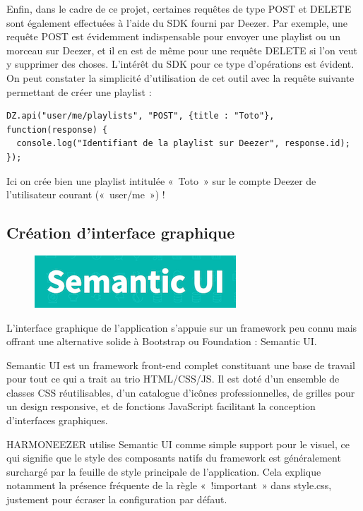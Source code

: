 \documentclass[a4paper,12pt]{article}
\begin{document}
Enfin, dans le cadre de ce projet, certaines requêtes de type POST et DELETE sont également effectuées à l'aide du SDK fourni par Deezer. Par exemple, une requête POST est évidemment indispensable pour envoyer une playlist ou un morceau sur Deezer, et il en est de même pour une requête DELETE si l'on veut y supprimer des choses. L'intérêt du SDK pour ce type d'opérations est évident. On peut constater la simplicité d'utilisation de cet outil avec la requête suivante permettant de créer une playlist :

\vspace{7pt}

\begin{lstlisting}
DZ.api("user/me/playlists", "POST", {title : "Toto"}, function(response) {
  console.log("Identifiant de la playlist sur Deezer", response.id);
});
\end{lstlisting}

Ici on crée bien une playlist intitulée «~Toto~» sur le compte Deezer de l'utilisateur courant («~user/me~») !

\newpage

\subsection{Création d'interface graphique}

\begin{figure}[!h]
  \begin{center}
    \includegraphics[scale=0.5]{logo-semanticui.png}
  \end{center}
\end{figure}

L'interface graphique de l'application s'appuie sur un framework peu connu mais offrant une alternative solide à Bootstrap ou Foundation : Semantic UI.

Semantic UI est un framework front-end complet constituant une base de travail pour tout ce qui a trait au trio HTML/CSS/JS. Il est doté d'un ensemble de classes CSS réutilisables, d'un catalogue d'icônes professionnelles, de grilles pour un design responsive, et de fonctions JavaScript facilitant la conception d'interfaces graphiques.

HARMONEEZER utilise Semantic UI comme simple support pour le visuel, ce qui signifie que le style des composants natifs du framework est généralement surchargé par la feuille de style principale de l'application. Cela explique notamment la présence fréquente de la règle «~!important~» dans style.css, justement pour écraser la configuration par défaut.
\end{document}
